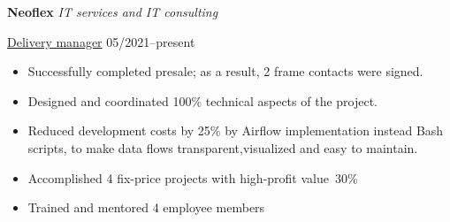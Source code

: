 \textbf{Neoflex} \textit{IT services and IT consulting} \par
\underline{Delivery manager} \hfill 05/2021--present
\begin{itemize}
	\item Successfully completed presale; as a result, 2 frame contacts were signed.
 	\item Designed and coordinated 100\% technical aspects of the project.
 	\item Reduced development costs by 25\% by Airflow implementation instead Bash scripts,  to make data flows transparent,visualized and easy to maintain.
	\item Accomplished 4 fix-price projects with high-profit value~30\%
 	\item Trained and mentored 4 employee members
\end{itemize}\par
